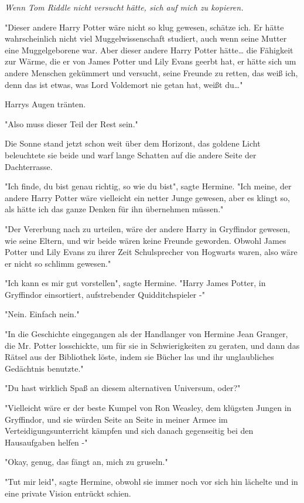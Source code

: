 {\emph{Wenn Tom Riddle nicht versucht hätte, sich auf mich zu kopieren.}

"Dieser andere Harry Potter wäre nicht so klug gewesen, schätze ich. Er hätte wahrscheinlich nicht viel Muggelwissenschaft studiert, auch wenn seine Mutter eine Muggelgeborene war. Aber dieser andere Harry Potter hätte… die Fähigkeit zur Wärme, die er von James Potter und Lily Evans geerbt hat, er hätte sich um andere Menschen gekümmert und versucht, seine Freunde zu retten, das weiß ich, denn das ist etwas, was Lord Voldemort nie getan hat, weißt du…"

Harrys Augen tränten.

"Also muss dieser Teil der Rest sein."

Die Sonne stand jetzt schon weit über dem Horizont, das goldene Licht beleuchtete sie beide und warf lange Schatten auf die andere Seite der Dachterrasse.

"Ich finde, du bist genau richtig, so wie du bist", sagte Hermine. "Ich meine, der andere Harry Potter wäre vielleicht ein netter Junge gewesen, aber es klingt so, als hätte ich das ganze Denken für ihn übernehmen müssen."

"Der Vererbung nach zu urteilen, wäre der andere Harry in Gryffindor gewesen, wie seine Eltern, und wir beide wären keine Freunde geworden. Obwohl James Potter und Lily Evans zu ihrer Zeit Schulsprecher von Hogwarts waren, also wäre er nicht so schlimm gewesen."

"Ich kann es mir gut vorstellen", sagte Hermine. "Harry James Potter, in Gryffindor einsortiert, aufstrebender Quidditchspieler -"

"Nein. Einfach nein."

"In die Geschichte eingegangen als der Handlanger von Hermine Jean Granger, die Mr. Potter losschickte, um für sie in Schwierigkeiten zu geraten, und dann das Rätsel aus der Bibliothek löste, indem sie Bücher las und ihr unglaubliches Gedächtnis benutzte."

"Du hast wirklich Spaß an diesem alternativen Universum, oder?"

"Vielleicht wäre er der beste Kumpel von Ron Weasley, dem klügsten Jungen in Gryffindor, und sie würden Seite an Seite in meiner Armee im Verteidigungsunterricht kämpfen und sich danach gegenseitig bei den Hausaufgaben helfen -"

"Okay, genug, das fängt an, mich zu gruseln."

"Tut mir leid", sagte Hermine, obwohl sie immer noch vor sich hin lächelte und in eine private Vision entrückt schien.

}
